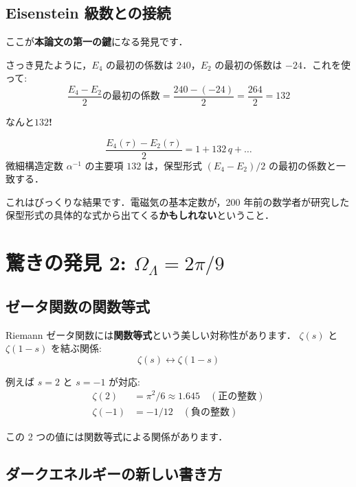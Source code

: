 \documentclass[11pt,a4paper]{article}
\begin{document}
\subsection{Eisenstein 級数との接続}

ここが\textbf{本論文の第一の鍵}になる発見です．

さっき見たように，$E_4$ の最初の係数は $240$，$E_2$ の最初の係数は
$-24$．これを使って:
\begin{equation*}
\frac{E_4 - E_2}{2}\text{の最初の係数} = \frac{240 - (-24)}{2} = \frac{264}{2} = 132
\end{equation*}

なんと\textbf{$132$!}

\begin{tcolorbox}[colback=green!5,colframe=green!60!black,title=発見 1]
\begin{equation*}
\frac{E_4(\tau) - E_2(\tau)}{2} = 1 + 132\, q + \ldots
\end{equation*}
微細構造定数 $\alpha^{-1}$ の主要項 $132$ は，保型形式 $(E_4 - E_2)/2$
の最初の係数と一致する．
\end{tcolorbox}

これはびっくりな結果です．電磁気の基本定数が，200 年前の数学者が研究した
保型形式の具体的な式から出てくる\textbf{かもしれない}ということ．

\section{驚きの発見 2: $\Omega_\Lambda = 2\pi/9$}

\subsection{ゼータ関数の関数等式}

Riemann ゼータ関数には\textbf{関数等式}という美しい対称性があります．
$\zeta(s)$ と $\zeta(1-s)$ を結ぶ関係:
\begin{equation*}
\zeta(s) \leftrightarrow \zeta(1-s)
\end{equation*}

例えば $s = 2$ と $s = -1$ が対応:
\begin{align*}
\zeta(2) &= \pi^2/6 \approx 1.645 \quad (\text{正の整数})\\
\zeta(-1) &= -1/12 \quad (\text{負の整数})
\end{align*}

この 2 つの値には関数等式による関係があります．

\subsection{ダークエネルギーの新しい書き方}
\end{document}
